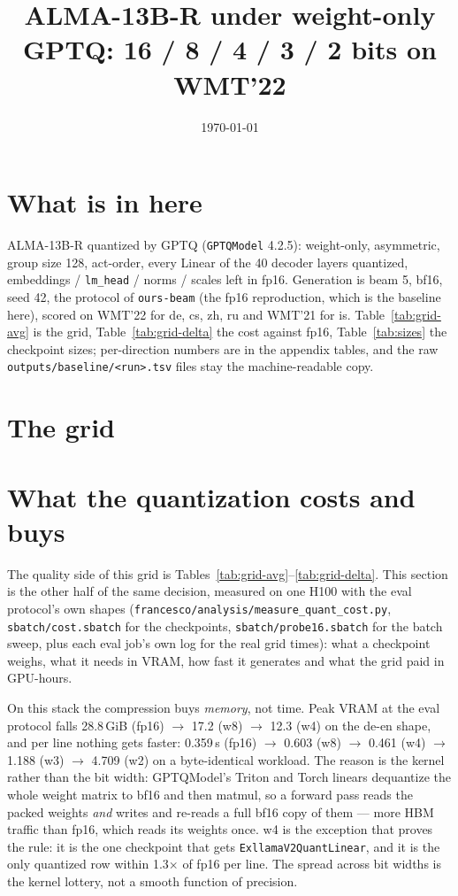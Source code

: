 \documentclass[10pt]{article}
\title{ALMA-13B-R under weight-only GPTQ: 16 / 8 / 4 / 3 / 2 bits on WMT'22}
\author{}
\date{\today}
\begin{document}
\maketitle


\section*{What is in here}

ALMA-13B-R quantized by GPTQ (\texttt{GPTQModel} 4.2.5): weight-only, asymmetric,
group size 128, act-order, every Linear of the 40 decoder layers quantized, embeddings /
\texttt{lm\_head} / norms / scales left in fp16. Generation is beam 5, bf16, seed 42, the
protocol of \texttt{ours-beam} (the fp16 reproduction, which is the baseline here), scored
on WMT'22 for de, cs, zh, ru and WMT'21 for is. Table~\ref{tab:grid-avg} is the grid,
Table~\ref{tab:grid-delta} the cost against fp16, Table~\ref{tab:sizes} the checkpoint
sizes; per-direction numbers are in the appendix tables, and the raw
\texttt{outputs/baseline/<run>.tsv} files stay the machine-readable copy.

\section*{The grid}


\clearpage
\section*{What the quantization costs and buys}

The quality side of this grid is Tables~\ref{tab:grid-avg}--\ref{tab:grid-delta}. This section is
the other half of the same decision, measured on one H100 with the eval protocol's own shapes
(\texttt{francesco/analysis/measure\_quant\_cost.py}, \texttt{sbatch/cost.sbatch} for the
checkpoints, \texttt{sbatch/probe16.sbatch} for the batch sweep, plus each eval job's own log for
the real grid times): what a checkpoint weighs, what it needs in VRAM, how fast it generates and
what the grid paid in GPU-hours.

On this stack the compression buys \emph{memory}, not time. Peak VRAM at the eval protocol falls
28.8\,GiB (fp16) $\rightarrow$ 17.2 (w8) $\rightarrow$ 12.3 (w4) on the de-en shape, and per line
nothing gets faster: 0.359\,s (fp16) $\rightarrow$ 0.603 (w8) $\rightarrow$ 0.461 (w4)
$\rightarrow$ 1.188 (w3) $\rightarrow$ 4.709 (w2) on a byte-identical workload. The reason is the
kernel rather than the bit width: GPTQModel's Triton and Torch linears dequantize the whole weight
matrix to bf16 and then matmul, so a forward pass reads the packed weights \emph{and} writes and
re-reads a full bf16 copy of them --- more HBM traffic than fp16, which reads its weights once. w4 is
the exception that proves the rule: it is the one checkpoint that gets \texttt{ExllamaV2QuantLinear},
and it is the only quantized row within 1.3$\times$ of fp16 per line. The spread across bit widths is
the kernel lottery, not a smooth function of precision.
\end{document}

